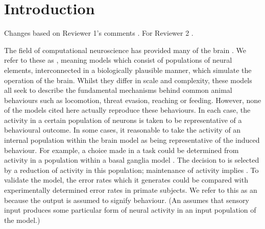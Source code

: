 \documentclass{frontiersSCNS}
\begin{document}
\section{Introduction} \label{sec:introduction}

 Changes based on Reviewer 1's comments . For
Reviewer 2 .

The field of computational neuroscience has provided many  of the
brain \citep{arai_two-dimensional_1994,gancarz_neural_1998,hazy_towards_2007,blenkinsop_frequency_2017}.
We refer to these as , meaning
models which consist of populations of neural elements, interconnected
in a biologically plausible manner, which simulate the operation of
the brain. Whilst they differ in scale and complexity, these models
all seek to describe the fundamental mechanisms behind common animal
behaviours such as locomotion, threat evasion, reaching or
feeding. However, none of the models cited here actually reproduce
these behaviours. In each case, the activity in a certain population
of neurons is taken to be representative of a behavioural outcome.
In some cases, it  reasonable to take the activity of an
internal population within the brain model as being representative of
the induced behaviour. For example, a choice made in a 
task could be determined from activity in a population within a basal
ganglia model
\citep{nambu_discharge_1990,kuhn_event-related_2004}. The decision
to  is selected by a reduction of activity in this population;
maintenance of activity implies . To validate the model, the
error rates which it generates could be compared with experimentally
determined error rates in primate subjects. We refer to this as
an  because the output is assumed to
signify behaviour. (An  assumes that sensory
input produces some particular form of neural activity in an input
population of the model.)
\end{document}
